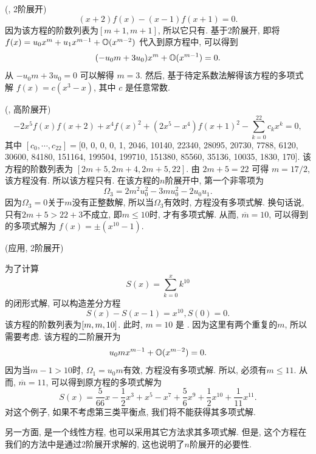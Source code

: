 \begin{example} \label{examp-3}
(\BPthree{}, 2阶展开)
\begin{equation}
(x+2)f(x)-(x-1)f(x+1)=0. \label{ep3}
\end{equation}
因为该方程的阶数列表为$[m+1,m+1]$, 所以它只有\BPthree{}. 基于2阶展开, 即将$f(x)=u_0 x^m + u_1 x^{m-1} + \mathbb O(x^{m-2})$ 代入到原方程中, 可以得到
\begin{equation}
(-u_0 m+3u_0)x^m+\mathbb O(x^{m-1})=0.
\end{equation}
从 $-u_0 m+3u_0=0$ 可以解得 $m=3$. 然后, 基于待定系数法解得该方程的多项式解 $f(x)=c(x^3-x)$, 其中 $c$ 是任意常数.
\end{example}

\begin{example}
(\BPthree{}, 高阶展开)
\begin{equation}
-2x^5f(x)f(x+2)+x^4f(x)^2+(2x^5-x^4)f(x+1)^2-\sum_{k=0}^{22}{c_k x^k}=0, \label{ep4}
\end{equation}
其中 $[c_0,\cdots,c_{22}]=$[0, 0, 0, 0, 1, 2046, 10140, 22340, 28095, 20730, 7788, 6120, 30600, 84180, 151164, 199504, 199710, 151380, 85560, 35136, 10035, 1830, 170]. 该方程的阶数列表为 $[2m+5,2m+4,2m+5,22]$. 由 $2m+5=22$ 可得 $ m=17/2$, 该方程没有\BPone{}. 所以该方程只有\BPthree{}. 在该方程的$n$阶展开中, 第一个非零项为 
\begin{equation}
\Omega_3 = 2m^2u_0^2-3mu_0^2-2u_0u_1.
\end{equation}
因为$\Omega_3=0$关于$m$没有正整数解, 所以当$\Omega_3$有效时, 方程没有多项式解. 换句话说, 只有$2m+5>22+3$不成立, 即$m\le 10$时, 才有多项式解. 从而, $\overline m =10$, 可以得到 的多项式解为 $f(x)=\pm (x^{10}-1)$.
\end{example}

\begin{example}
(应用, 2阶展开)

为了计算 
\begin{equation}
    S(x)=\sum_{k=0}^x{k^{10}}
\end{equation}
的闭形式解, 可以构造差分方程
\begin{equation}
    S(x)-S(x-1)=x^{10}, S(0)=0. \label{seq}
\end{equation}
该方程的阶数列表为$\left[m,m,10\right]$. 此时, $m=10$ 是 \BPone{}. 因为这里有两个重复的$m$, 所以需要考虑\BPthree{}. 该方程的二阶展开为
\begin{equation}
u_0m x^{m-1}+\mathbb O(x^{m-2})=0.   
\end{equation}
因为当$m-1>10$时, $\Omega_1=u_0m$有效, 方程没有多项式解. 所以, 必须有$m\le 11$. 从而, $\overline m=11$, 可以得到原方程的多项式解为
\begin{equation}
S(x)=\frac{5}{66}x-\frac{1}{2}x^3+x^5-x^7+\frac{5}{6}x^9+\frac{1}{2}x^{10}+\frac{1}{11}x^{11}.
\end{equation}
对这个例子, 如果不考虑第三类平衡点, 我们将不能获得其多项式解. 

另一方面, 是一个线性方程, 也可以采用其它方法\cite{Abramov1989polynomial,Abramov1995polynomial}求其多项式解. 但是, 这个方程在我们的方法中是通过2阶展开求解的, 这也说明了$n$阶展开的必要性. 
\end{example}


